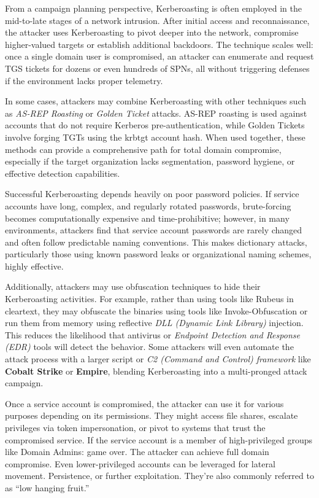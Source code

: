 From a campaign planning perspective, Kerberoasting is often employed in the mid-to-late stages of a network intrusion. After initial access and reconnaissance, the attacker uses Kerberoasting to pivot deeper into the network, compromise higher-valued targets or establish additional backdoors. The technique scales well: once a single domain user is compromised, an attacker can enumerate and request TGS tickets for dozens or even hundreds of SPNs, all without triggering defenses if the environment lacks proper telemetry.

In some cases, attackers may combine Kerberoasting with other techniques such as \textit{AS-REP Roasting} or \textit{Golden Ticket} attacks. AS-REP roasting is used against accounts that do not require Kerberos pre-authentication, while Golden Tickets involve forging TGTs using the krbtgt account hash. When used together, these methods can provide a comprehensive path for total domain compromise, especially if the target organization lacks segmentation, password hygiene, or effective detection capabilities.

Successful Kerberoasting depends heavily on poor password policies. If service accounts have long, complex, and regularly rotated passwords, brute-forcing becomes computationally expensive and time-prohibitive; however, in many environments, attackers find that service account passwords are rarely changed and often follow predictable naming conventions. This makes dictionary attacks, particularly those using known password leaks or organizational naming schemes, highly effective.

Additionally, attackers may use obfuscation techniques to hide their Kerberoasting activities. For example, rather than using tools like Rubeus in cleartext, they may obfuscate the binaries using tools like Invoke-Obfuscation or run them from memory using reflective \textit{DLL (Dynamic Link Library)} injection. This reduces the likelihood that antivirus or \textit{Endpoint Detection and Response (EDR)} tools will detect the behavior. Some attackers will even automate the attack process with a larger script or \textit{C2 (Command and Control) framework} like \textbf{Cobalt Strike} or \textbf{Empire}, blending Kerberoasting into a multi-pronged attack campaign.

Once a service account is compromised, the attacker can use it for various purposes depending on its permissions. They might access file shares, escalate privileges via token impersonation, or pivot to systems that trust the compromised service. If the service account is a member of high-privileged groups like Domain Admins: game over. The attacker can achieve full domain compromise. Even lower-privileged accounts can be leveraged for lateral movement. Persistence, or further exploitation. They’re also commonly referred to as “low hanging fruit.”

